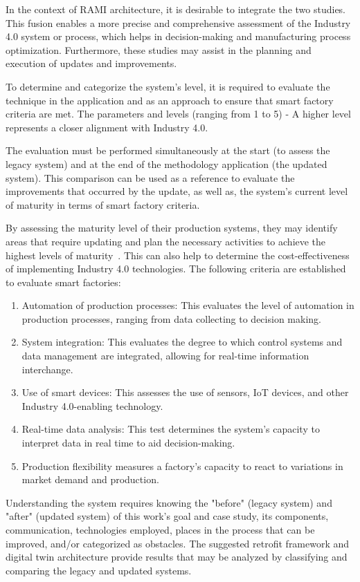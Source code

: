 \documentclass[journal]{IEEEtran}
\begin{document}
In the context of RAMI architecture, it is desirable to integrate the two studies. This fusion enables a more precise and comprehensive assessment of the Industry 4.0 system or process, which helps in decision-making and manufacturing process optimization. Furthermore, these studies may assist in the planning and execution of updates and improvements.

To determine and categorize the system's level, it is required to evaluate the technique in the application and as an approach to ensure that smart factory criteria are met. The parameters and levels (ranging from 1 to 5) - A higher level represents a closer alignment with Industry 4.0.

The evaluation must be performed simultaneously at the start (to assess the legacy system) and at the end of the methodology application (the updated system). This comparison can be used as a reference to evaluate the improvements that occurred by the update, as well as, the system's current level of maturity in terms of smart factory criteria.

By assessing the maturity level of their production systems, they may identify areas that require updating and plan the necessary activities to achieve the highest levels of maturity~\cite{lin2020}. This can also help to determine the cost-effectiveness of implementing Industry 4.0 technologies. The following criteria are established to evaluate smart factories:

\begin{enumerate}
    \item Automation of production processes: This evaluates the level of automation in production processes, ranging from data collecting to decision making.
    \item System integration: This evaluates the degree to which control systems and data management are integrated, allowing for real-time information interchange.
    \item Use of smart devices: This assesses the use of sensors, IoT devices, and other Industry 4.0-enabling technology.
    \item Real-time data analysis: This test determines the system's capacity to interpret data in real time to aid decision-making.
    \item Production flexibility measures a factory's capacity to react to variations in market demand and production.
\end{enumerate}

Understanding the system requires knowing the "before" (legacy system) and "after" (updated system) of this work's goal and case study, its components, communication, technologies employed, places in the process that can be improved, and/or categorized as obstacles. The suggested retrofit framework and digital twin architecture provide results that may be analyzed by classifying and comparing the legacy and updated systems.
\end{document}
